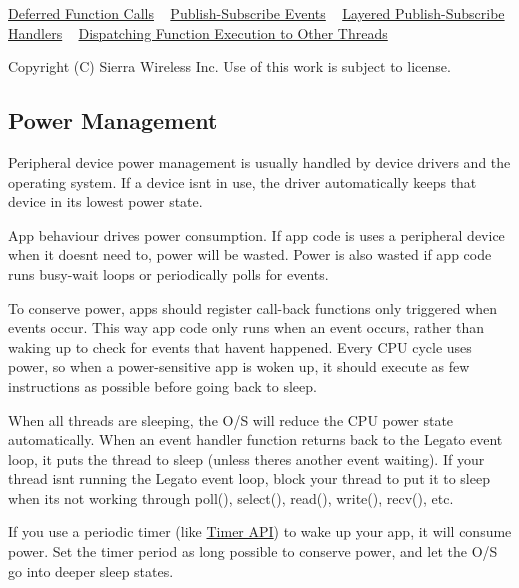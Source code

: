 \hyperlink{c_event_loop_c_event_deferredFunctionCalls}{Deferred Function Calls} ~\newline
 \hyperlink{c_event_loop_c_event_publishSubscribe}{Publish-\/\+Subscribe Events} ~\newline
 \hyperlink{c_event_loop_c_event_layeredPublishSubscribe}{Layered Publish-\/\+Subscribe Handlers} ~\newline
 \hyperlink{c_event_loop_c_event_dispatchingToOtherThreads}{Dispatching Function Execution to Other Threads} ~\newline






Copyright (C) Sierra Wireless Inc. Use of this work is subject to license. \hypertarget{basicPwrMgmt}{}\subsection{Power Management}\label{basicPwrMgmt}
Peripheral device power management is usually handled by device drivers and the operating system. If a device isn\textquotesingle{}t in use, the driver automatically keeps that device in its lowest power state.

App behaviour drives power consumption. If app code is uses a peripheral device when it doesn\textquotesingle{}t need to, power will be wasted. Power is also wasted if app code runs busy-\/wait loops or periodically polls for events.

To conserve power, apps should register call-\/back functions only triggered when events occur. This way app code only runs when an event occurs, rather than waking up to check for events that haven\textquotesingle{}t happened. Every C\+P\+U cycle uses power, so when a power-\/sensitive app is woken up, it should execute as few instructions as possible before going back to sleep.

When all threads are sleeping, the O/\+S will reduce the C\+P\+U power state automatically. When an event handler function returns back to the Legato event loop, it puts the thread to sleep (unless there\textquotesingle{}s another event waiting). If your thread isn\textquotesingle{}t running the Legato event loop, block your thread to put it to sleep when it\textquotesingle{}s not working through {\ttfamily poll()}, {\ttfamily select()}, {\ttfamily read()}, {\ttfamily write()}, {\ttfamily recv()}, etc.

If you use a periodic timer (like \hyperlink{c_timer}{Timer A\+P\+I}) to wake up your app, it will consume power. Set the timer period as long possible to conserve power, and let the O/\+S go into deeper sleep states.

